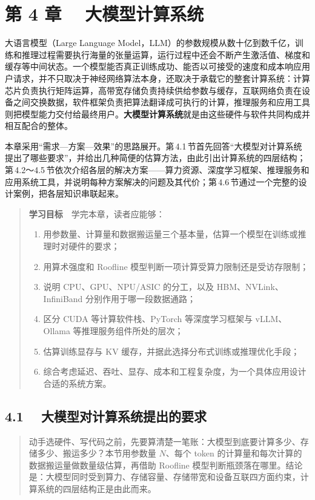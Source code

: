 \documentclass{article}
\begin{document}
\chapter*{第 4 章　 大模型计算系统}


大语言模型（{Large Language Model}，LLM）的参数规模从数十亿到数千亿，训练和推理过程需要执行海量的张量运算，运行过程中还会不断产生激活值、梯度和缓存等中间状态。一个模型能否真正训练成功、能否以可接受的速度和成本响应用户请求，并不只取决于神经网络算法本身，还取决于承载它的整套计算系统：计算芯片负责执行矩阵运算，高带宽存储负责持续供给参数与缓存，互联网络负责在设备之间交换数据，软件框架负责把算法翻译成可执行的计算，推理服务和应用工具则把模型能力交付给最终用户。\textbf{大模型计算系统}就是由这些硬件与软件共同构成并相互配合的整体。

本章采用“需求—方案—效果”的思路展开。第\,4.1\,节首先回答“大模型对计算系统提出了哪些要求”，并给出几种简便的估算方法，由此引出计算系统的四层结构；第\,4.2～4.5\,节依次介绍各层的解决方案——算力资源、深度学习框架、推理服务和应用系统工具，并说明每种方案解决的问题及其代价；第\,4.6\,节通过一个完整的设计案例，把各层知识串联起来。

\begin{quote}

\par\textbf{学习目标}　{学完本章，读者应能够：}
\begin{enumerate}[leftmargin=2em]
  \item 用参数量、计算量和数据搬运量三个基本量，估算一个模型在训练或推理时对硬件的要求；
  \item 用算术强度和 Roofline 模型判断一项计算受算力限制还是受访存限制；
  \item 说明 CPU、GPU、NPU/ASIC 的分工，以及 HBM、NVLink、InfiniBand 分别作用于哪一段数据通路；
  \item 区分 CUDA 等计算软件栈、PyTorch 等深度学习框架与 vLLM、Ollama 等推理服务组件所处的层次；
  \item 估算训练显存与 KV 缓存，并据此选择分布式训练或推理优化手段；
  \item 综合考虑延迟、吞吐、显存、成本和工程复杂度，为一个具体应用设计合适的系统方案。
\end{enumerate}
\end{quote}

\section*{4.1　 大模型对计算系统提出的要求}


\begin{quote}

\noindent 动手选硬件、写代码之前，先要算清楚一笔账：大模型到底要计算多少、存储多少、搬运多少？本节用参数量 $N$、每个 token 的计算量和每次计算的数据搬运量做数量级估算，再借助 Roofline 模型判断瓶颈落在哪里。结论是：大模型同时受到算力、存储容量、存储带宽和设备互联四方面约束，计算系统的四层结构正是由此而来。
\end{quote}
\end{document}
